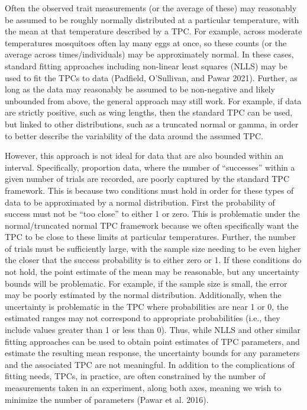 \documentclass[
  12pt,
]{article}
\begin{document}
Often the observed trait measurements (or the average of these) may
reasonably be assumed to be roughly normally distributed at a particular
temperature, with the mean at that temperature described by a TPC. For
example, across moderate temperatures mosquitoes often lay many eggs at
once, so these counts (or the average across times/individuals) may be
approximately normal. In these cases, standard fitting approaches
including non-linear least squares (NLLS) may be used to fit the TPCs to
data (Padfield, O'Sullivan, and Pawar 2021). Further, as long as the
data may reasonably be assumed to be non-negative and likely unbounded
from above, the general approach may still work. For example, if data
are strictly positive, such as wing lengths, then the standard TPC can
be used, but linked to other distributions, such as a truncated normal
or gamma, in order to better describe the variability of the data around
the assumed TPC.

However, this approach is not ideal for data that are also bounded
within an interval. Specifically, proportion data, where the number of
``successes'' within a given number of trials are recorded, are poorly
captured by the standard TPC framework. This is because two conditions
must hold in order for these types of data to be approximated by a
normal distribution. First the probability of success must not be ``too
close'' to either 1 or zero. This is problematic under the
normal/truncated normal TPC framework because we often specifically want
the TPC to be close to these limits at particular temperatures. Further,
the number of trials must be sufficiently large, with the sample size
needing to be even higher the closer that the success probability is to
either zero or 1. If these conditions do not hold, the point estimate of
the mean may be reasonable, but any uncertainty bounds will be
problematic. For example, if the sample size is small, the error may be
poorly estimated by the normal distribution. Additionally, when the
uncertainty is problematic in the TPC where probabilities are near 1 or
0, the estimated ranges may not correspond to appropriate probabilities
(i.e., they include values greater than 1 or less than 0). Thus, while
NLLS and other similar fitting approaches can be used to obtain point
estimates of TPC parameters, and estimate the resulting mean response,
the uncertainty bounds for any parameters and the associated TPC are not
meaningful. In addition to the complications of fitting needs, TPCs, in
practice, are often constrained by the number of measurements taken in
an experiment, along both axes, meaning we wish to minimize the number
of parameters (Pawar et al. 2016).
\end{document}

